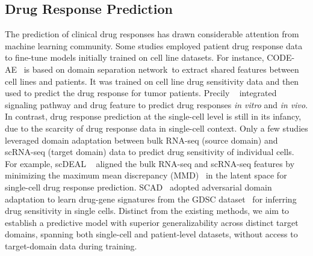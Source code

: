\subsection{Drug Response Prediction}
The prediction of clinical drug responses has drawn considerable attention from machine learning community. Some studies employed patient drug response data to fine-tune models initially trained on cell line datasets. For instance, CODE-AE~\cite{he2022context} is based on domain separation network~\cite{bousmalis2016domain}to extract shared features between cell lines and patients. It was trained on cell line drug sensitivity data and then used to predict the drug response for tumor patients. Precily ~\cite{chawla2022gene} integrated signaling pathway and drug feature to predict drug responses \textit{in vitro} and \textit{in vivo}. In contrast, drug response prediction at the single-cell level is still in its infancy, due to the scarcity of drug response data in single-cell context. Only a few studies leveraged domain adaptation between bulk RNA-seq (source domain) and scRNA-seq (target domain) data to predict drug sensitivity of individual cells. For example, scDEAL ~\cite{chen2022deep} aligned the bulk RNA-seq and scRNA-seq features by minimizing the maximum mean discrepancy (MMD)~\cite{gretton2012kernel} in the latent space for single-cell drug response prediction. SCAD~\cite{zheng2023enabling} adopted adversarial domain adaptation to learn drug-gene signatures from the GDSC dataset~\cite{yang2012genomics} for inferring drug sensitivity in single cells. Distinct from the existing methods, we aim to establish a predictive model with superior generalizability across distinct target domains, spanning both single-cell and patient-level datasets, without access to target-domain data during training.